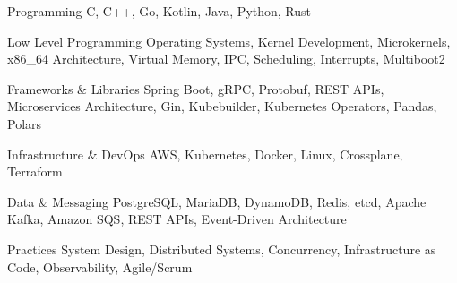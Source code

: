 
\begin{cvskills}

	\cvskill
	{Programming}
	{C, C++, Go, Kotlin, Java, Python, Rust}

	\cvskill
	{Low Level Programming}
	{Operating Systems, Kernel Development, Microkernels, x86\_64 Architecture, Virtual Memory, IPC, Scheduling, Interrupts, Multiboot2}

  \cvskill
  {Frameworks \& Libraries}
  {Spring Boot, gRPC, Protobuf, REST APIs, Microservices Architecture, Gin, Kubebuilder, Kubernetes Operators, Pandas, Polars}

	\cvskill
	{Infrastructure \& DevOps}
	{AWS, Kubernetes, Docker, Linux, Crossplane, Terraform}

	\cvskill
	{Data \& Messaging}
	{PostgreSQL, MariaDB, DynamoDB, Redis, etcd, Apache Kafka, Amazon SQS, REST APIs, Event-Driven Architecture}

	\cvskill
	{Practices}
	{System Design, Distributed Systems, Concurrency, Infrastructure as Code, Observability, Agile/Scrum}

\end{cvskills}
